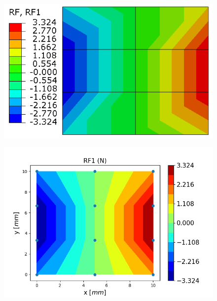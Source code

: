 \documentclass[12pt]{article}
\begin{document}
\begin{figure}[H]
	\centering
	\begin{minipage}{.5\textwidth}
		\centering
		\includegraphics[width=1\linewidth]{EM23RF1.png}
		\label{EM23RF1}
	\end{minipage}%
	\begin{minipage}{.6\textwidth}
		\centering
		\includegraphics[width=1\linewidth]{EM23RF1_IGA.png}
		\label{EM23RF1_IGA}
	\end{minipage}
\end{figure}
\end{document}
